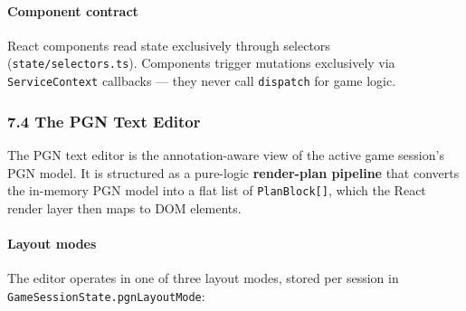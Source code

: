 \documentclass[]{article}
\let\oldparagraph\paragraph
\renewcommand{\paragraph}[1]{\oldparagraph{#1}\mbox{}}
\begin{document}
\paragraph{Component contract}\label{component-contract}

React components read state exclusively through selectors
(\texttt{state/selectors.ts}). Components trigger mutations exclusively
via \texttt{ServiceContext} callbacks --- they never call
\texttt{dispatch} for game logic.

\subsubsection{7.4 The PGN Text Editor}\label{the-pgn-text-editor}

The PGN text editor is the annotation-aware view of the active game
session's PGN model. It is structured as a pure-logic
\textbf{render-plan pipeline} that converts the in-memory PGN model into
a flat list of \texttt{PlanBlock{[}{]}}, which the React render layer
then maps to DOM elements.

\paragraph{Layout modes}\label{layout-modes}

The editor operates in one of three layout modes, stored per session in
\texttt{GameSessionState.pgnLayoutMode}:
\end{document}
